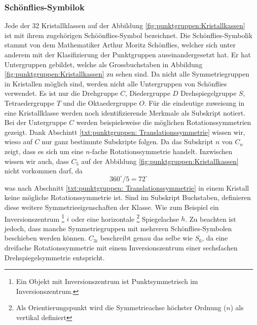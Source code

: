 \subsubsection{Schönflies-Symbilok}
Jede der 32 Kristallklassen auf der Abbildung \ref{fig:punktgruppen:Kristallkassen} ist mit ihrem zugehörigen Schöönflies-Symbol bezeichnet.
Die Schönflies-Symbolik stammt von dem Mathematiker Arthur Moritz Schönflies, 
welcher sich unter anderem mit der Klasifizierung der Punktgruppen auseinandergesetzt hat.
Er hat Untergruppen gebildet, welche als Grossbuchstaben in Abbildung \ref{fig:punktgruppen:Kristallkassen} zu sehen sind.
Da nicht alle Symmetriegruppen in Kristallen möglich sind, werden nicht alle Untergruppen von Schönflies verwendet.
Es ist nur die Drehgruppe \(C\), Diedergruppe \(D\) Drehspiegelgruppe \(S\), Tetraedergruppe \(T\) und die Oktaedergruppe \(O\).
Für die eindeutige zuweisung in eine Kristallklasse werden noch identifizierende Merkmale als Subskript notiert.
Bei der Untergruppe \(C\) werden beispielsweise die möglichen Rotationssymmetrien gezeigt.
Dank Abschintt \ref{txt:punktgruppen: Translationssymmetrie} wissen wir, wieso auf \(C\) nur ganz bestimmte Subskripte folgen.
Da das Subskript \(n\) von \(C_n\) zeigt, dass es sich um eine \(n\)-fache Rotationssymmetrie handelt.
Inzwischen wissen wir auch, dass \(C_5\) auf der Abbildung \ref{fig:punktgruppen:Kristallkassen} nicht vorkommen darf, da 
\[
    360^\circ/5 =  72^\circ
\]
was nach Abschnitt \ref{txt:punktgruppen: Translationssymmetrie} in einem Kristall keine mögliche Rotationssymmetrie ist.
Sind im Subskript Buchstaben, definieren diese weitere Symmetrieeigenschaften der Klasse.
Wie zum Beispiel ein Inversionszentrum
\footnote{Ein Objekt mit Inversionszentrum ist Punktsymmetrisch im Inversionszentrum.}
\(i\) oder eine horizontale
\footnote{Als Orientierungspunkt wird die Symmetrieachse höchster Ordnung (\(n\)) als vertikal definiert} 
Spiegelachse \(h\). 
Zu beachten ist jedoch, dass manche Symmetriegruppen mit mehreren Schönflies-Symbolen beschieben werden können.
\(C_{3i}\) beschreibt genau das selbe wie \(S_6\), da eine dreifache Rotationssymmetrie mit einem Inversionszentrum einer
sechsfachen Drehspiegelsymmetrie entspricht.




